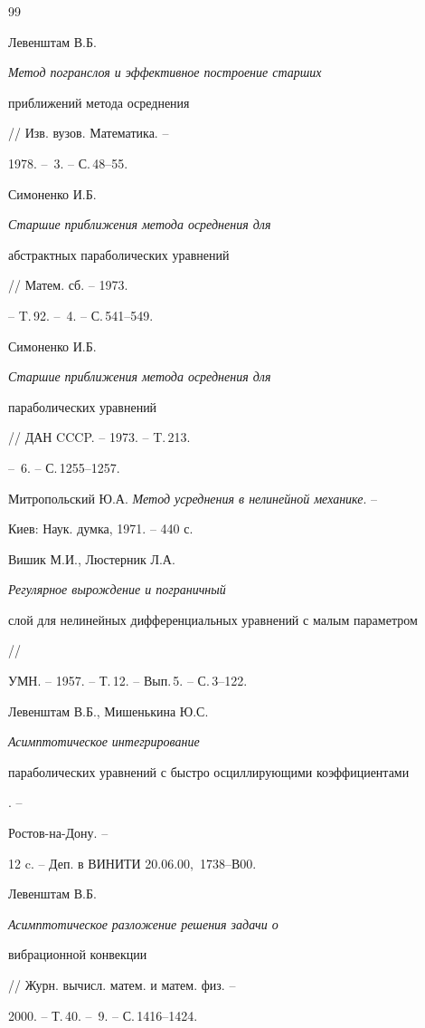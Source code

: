 \begin{thebibliography}{99} 


 




Левенштам В.Б. {\em Метод погранслоя и эффективное построение старших  


приближений метода осреднения} // Изв. вузов. Математика. -- 


1978. -- \No\,3. -- С.\,48--55. 




Симоненко И.Б. {\em Старшие приближения метода осреднения для 


абстрактных параболических уравнений} // Матем. сб. -- 1973. 


-- T.\,92. -- \No\,4. -- С.\,541--549. 




Симоненко И.Б. {\em Старшие приближения метода осреднения для 


параболических уравнений} // ДАН CCCP. -- 1973. -- T.\,213. 


-- \No\,6. -- С.\,1255--1257.  




Митропольский Ю.А. {\em Метод усреднения в нелинейной механике}. --  


Киев: Наук. думка, 1971. -- 440 с. 




Вишик М.И., Люстерник Л.А. {\em Регулярное вырождение и пограничный  


слой для нелинейных дифференциальных уравнений с малым параметром} //  


УМН. -- 1957. -- Т.\,12. -- Вып.\,5. -- С.\,3--122. 




Левенштам В.Б., Мишенькина Ю.С. {\em Асимптотическое интегрирование  


параболических уравнений с быстро осциллирующими коэффициентами}. --


Ростов-на-Дону. -- 


12 c. -- Деп. в ВИНИТИ 20.06.00, \No\,1738--В00. 




Левенштам В.Б. {\em Асимптотическое разложение решения задачи о 


вибрационной конвекции} // Журн. вычисл. матем. и матем. физ. -- 


2000. -- Т.\,40. -- \No\,9. -- С.\,1416--1424.  



\end{thebibliography}
